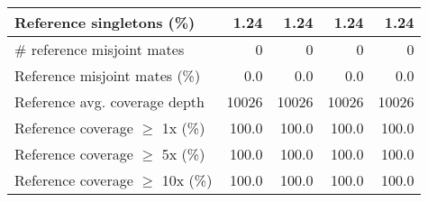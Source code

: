\documentclass[12pt,a4paper]{article}
\begin{document}
\begin{table}[ht]
\begin{center}
\begin{tabular}{|l*{4}{|r}|}
Reference singletons (\%) & 1.24 & 1.24 & 1.24 & 1.24 \\ \hline
\# reference misjoint mates & 0 & 0 & 0 & 0 \\ \hline
Reference misjoint mates (\%) & 0.0 & 0.0 & 0.0 & 0.0 \\ \hline
Reference avg. coverage depth & 10026 & 10026 & 10026 & 10026 \\ \hline
Reference coverage $\geq$ 1x (\%) & 100.0 & 100.0 & 100.0 & 100.0 \\ \hline
Reference coverage $\geq$ 5x (\%) & 100.0 & 100.0 & 100.0 & 100.0 \\ \hline
Reference coverage $\geq$ 10x (\%) & 100.0 & 100.0 & 100.0 & 100.0 \\ \hline
\end{tabular}
\end{center}
\end{table}
\end{document}
